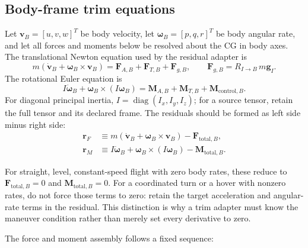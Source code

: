 \documentclass[11pt]{article}
\begin{document}
\subsection{Body-frame trim equations}

Let $\boldsymbol v_B=[u,v,w]^T$ be body velocity, let
$\boldsymbol\omega_B=[p,q,r]^T$ be body angular rate, and let all forces and
moments below be resolved about the CG in body axes. The translational Newton
equation used by the residual adapter is
\[
  m\left(\dot{\boldsymbol v}_B
    +\boldsymbol\omega_B\times\boldsymbol v_B\right)
  =\boldsymbol F_{A,B}+\boldsymbol F_{T,B}+\boldsymbol F_{g,B},
  \qquad
  \boldsymbol F_{g,B}=R_{I\to B}\,m\boldsymbol g_I.
\]
The rotational Euler equation is
\[
  I\dot{\boldsymbol\omega}_B
  +\boldsymbol\omega_B\times(I\boldsymbol\omega_B)
  =\boldsymbol M_{A,B}+\boldsymbol M_{T,B}+\boldsymbol M_{\mathrm{control},B}.
\]
For diagonal principal inertia,
$I=\operatorname{diag}(I_x,I_y,I_z)$; for a source tensor, retain the full
tensor and its declared frame. The residuals should be formed as left side
minus right side:
\begin{align}
  \boldsymbol r_F &\equiv
    m\left(\dot{\boldsymbol v}_B+\boldsymbol\omega_B\times\boldsymbol v_B\right)
    -\boldsymbol F_{\mathrm{total},B},\\
  \boldsymbol r_M &\equiv
    I\dot{\boldsymbol\omega}_B
    +\boldsymbol\omega_B\times(I\boldsymbol\omega_B)
    -\boldsymbol M_{\mathrm{total},B}.
\end{align}

For straight, level, constant-speed flight with zero body rates, these reduce
to $\boldsymbol F_{\mathrm{total},B}=0$ and
$\boldsymbol M_{\mathrm{total},B}=0$. For a coordinated turn or a hover with
nonzero rates, do not force those terms to zero: retain the target acceleration
and angular-rate terms in the residual. This distinction is why a trim adapter
must know the maneuver condition rather than merely set every derivative to
zero.

The force and moment assembly follows a fixed sequence:
\end{document}

